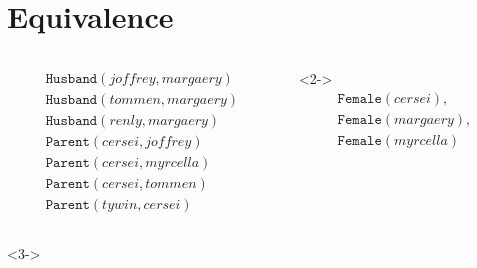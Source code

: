 \documentclass{beamer}
\begin{document}
\section{Equivalence}

\begin{frame}
  \begin{columns}
    \begin{column}{0.5\textwidth}
      \begin{alertblock}{}
        \vspace*{-1.5\baselineskip}\setlength\belowdisplayshortskip{0pt}
        \begin{gather*}
          \mathtt{Husband}(\mathit{joffrey}, \mathit{margaery}) \\
          \mathtt{Husband}(\mathit{tommen}, \mathit{margaery}) \\
          \mathtt{Husband}(\mathit{renly}, \mathit{margaery}) \\
          \mathtt{Parent}(\mathit{cersei}, \mathit{joffrey}) \\
          \mathtt{Parent}(\mathit{cersei}, \mathit{myrcella}) \\
          \mathtt{Parent}(\mathit{cersei}, \mathit{tommen}) \\
          \mathtt{Parent}(\mathit{tywin}, \mathit{cersei})
        \end{gather*}
        \vspace*{-1.5\baselineskip}\setlength\belowdisplayshortskip{0pt}
      \end{alertblock}
    \end{column}
    \begin{column}{0.5\textwidth}
      \begin{exampleblock}{}<2->
        \vspace*{-1.5\baselineskip}\setlength\belowdisplayshortskip{0pt}
        \begin{gather*}
          \mathtt{Female}(\mathit{cersei}), \\
          \mathtt{Female}(\mathit{margaery}), \\
          \mathtt{Female}(\mathit{myrcella})
        \end{gather*}
        \vspace*{-1.5\baselineskip}\setlength\belowdisplayshortskip{0pt}
      \end{exampleblock}
    \end{column}
  \end{columns}
  \begin{block}{}<3->
    \vspace*{-1.5\baselineskip}\setlength\belowdisplayshortskip{0pt}

\end{block}
\end{frame}
\end{document}
